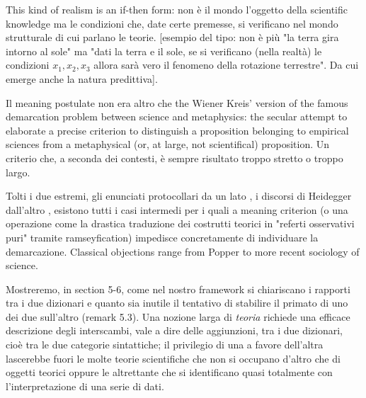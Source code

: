 This kind of realism is an if-then form: non è il mondo l'oggetto della scientific knowledge ma le condizioni che, date certe premesse, si verificano nel mondo strutturale di cui parlano le teorie. [esempio del tipo: non è più "la terra gira intorno al sole" ma "dati la terra e il sole, se si verificano (nella realtà) le condizioni $x_1,x_2,x_3$ allora sarà vero il fenomeno della rotazione terrestre". Da cui emerge anche la natura predittiva]. 

Il meaning postulate non era altro che the Wiener Kreis' version of the famous demarcation problem between science and metaphysics: the secular attempt to elaborate a precise criterion to distinguish a proposition belonging to empirical sciences from a metaphysical (or, at large, not scientifical) proposition. Un criterio che, a seconda dei contesti, è sempre risultato troppo stretto o troppo largo. 

Tolti i due estremi, gli enunciati protocollari da un lato \cite{?}, i discorsi di Heidegger dall'altro \cite{?}, esistono tutti i casi intermedi per i quali a meaning criterion (o una operazione come la drastica traduzione dei costrutti teorici in "referti osservativi puri" tramite ramseyfication) impedisce concretamente di individuare la demarcazione. Classical objections range from Popper \cite{?} to more recent sociology of science.

Mostreremo, in section 5-6, come nel nostro framework si chiariscano i rapporti tra i due dizionari e quanto sia inutile il tentativo di stabilire il primato di uno dei due sull'altro (remark 5.3). Una nozione larga di \emph{teoria} richiede una efficace descrizione degli interscambi, vale a dire delle aggiunzioni, tra i due dizionari, cioè tra le due categorie sintattiche; il privilegio di una a favore dell'altra lascerebbe fuori le molte teorie scientifiche che non si occupano d'altro che di oggetti teorici oppure le altrettante che si identificano quasi totalmente con l'interpretazione di una serie di dati. 



